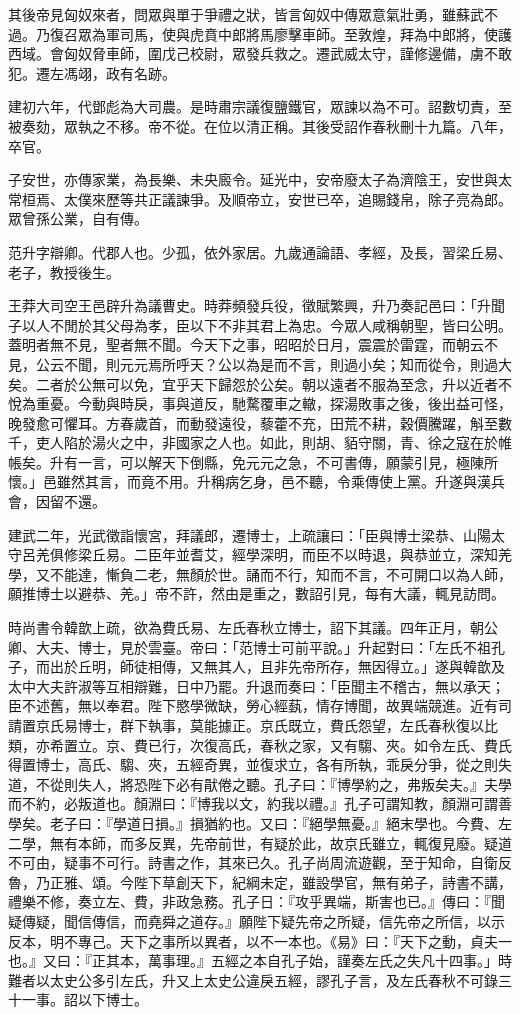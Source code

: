 \begin{pinyinscope}
其後帝見匈奴來者，問眾與單于爭禮之狀，皆言匈奴中傳眾意氣壯勇，雖蘇武不過。乃復召眾為軍司馬，使與虎賁中郎將馬廖擊車師。至敦煌，拜為中郎將，使護西域。會匈奴脅車師，圍戊己校尉，眾發兵救之。遷武威太守，謹修邊備，虜不敢犯。遷左馮翊，政有名跡。

建初六年，代鄧彪為大司農。是時肅宗議復鹽鐵官，眾諫以為不可。詔數切責，至被奏劾，眾執之不移。帝不從。在位以清正稱。其後受詔作春秋刪十九篇。八年，卒官。

子安世，亦傳家業，為長樂、未央廄令。延光中，安帝廢太子為濟陰王，安世與太常桓焉、太僕來歷等共正議諫爭。及順帝立，安世已卒，追賜錢帛，除子亮為郎。眾曾孫公業，自有傳。

范升字辯卿。代郡人也。少孤，依外家居。九歲通論語、孝經，及長，習梁丘易、老子，教授後生。

王莽大司空王邑辟升為議曹史。時莽頻發兵役，徵賦繁興，升乃奏記邑曰：「升聞子以人不閒於其父母為孝，臣以下不非其君上為忠。今眾人咸稱朝聖，皆曰公明。蓋明者無不見，聖者無不聞。今天下之事，昭昭於日月，震震於雷霆，而朝云不見，公云不聞，則元元焉所呼天？公以為是而不言，則過小矣；知而從令，則過大矣。二者於公無可以免，宜乎天下歸怨於公矣。朝以遠者不服為至念，升以近者不悅為重憂。今動與時戾，事與道反，馳騖覆車之轍，探湯敗事之後，後出益可怪，晚發愈可懼耳。方春歲首，而動發遠役，藜藿不充，田荒不耕，穀價騰躍，斛至數千，吏人陷於湯火之中，非國家之人也。如此，則胡、貊守關，青、徐之寇在於帷帳矣。升有一言，可以解天下倒縣，免元元之急，不可書傳，願蒙引見，極陳所懷。」邑雖然其言，而竟不用。升稱病乞身，邑不聽，令乘傳使上黨。升遂與漢兵會，因留不還。

建武二年，光武徵詣懷宮，拜議郎，遷博士，上疏讓曰：「臣與博士梁恭、山陽太守呂羌俱修梁丘易。二臣年並耆艾，經學深明，而臣不以時退，與恭並立，深知羌學，又不能達，慚負二老，無顏於世。誦而不行，知而不言，不可開口以為人師，願推博士以避恭、羌。」帝不許，然由是重之，數詔引見，每有大議，輒見訪問。

時尚書令韓歆上疏，欲為費氏易、左氏春秋立博士，詔下其議。四年正月，朝公卿、大夫、博士，見於雲臺。帝曰：「范博士可前平說。」升起對曰：「左氏不祖孔子，而出於丘明，師徒相傳，又無其人，且非先帝所存，無因得立。」遂與韓歆及太中大夫許淑等互相辯難，日中乃罷。升退而奏曰：「臣聞主不稽古，無以承天；臣不述舊，無以奉君。陛下愍學微缺，勞心經蓺，情存博聞，故異端競進。近有司請置京氏易博士，群下執事，莫能據正。京氏既立，費氏怨望，左氏春秋復以比類，亦希置立。京、費已行，次復高氏，春秋之家，又有騶、夾。如令左氏、費氏得置博士，高氏、騶、夾，五經奇異，並復求立，各有所執，乖戾分爭，從之則失道，不從則失人，將恐陛下必有猒倦之聽。孔子曰：『博學約之，弗叛矣夫。』夫學而不約，必叛道也。顏淵曰：『博我以文，約我以禮。』孔子可謂知教，顏淵可謂善學矣。老子曰：『學道日損。』損猶約也。又曰：『絕學無憂。』絕末學也。今費、左二學，無有本師，而多反異，先帝前世，有疑於此，故京氏雖立，輒復見廢。疑道不可由，疑事不可行。詩書之作，其來已久。孔子尚周流遊觀，至于知命，自衛反魯，乃正雅、頌。今陛下草創天下，紀綱未定，雖設學官，無有弟子，詩書不講，禮樂不修，奏立左、費，非政急務。孔子日：『攻乎異端，斯害也已。』傳曰：『聞疑傳疑，聞信傳信，而堯舜之道存。』願陛下疑先帝之所疑，信先帝之所信，以示反本，明不專己。天下之事所以異者，以不一本也。《易》曰：『天下之動，貞夫一也。』又曰：『正其本，萬事理。』五經之本自孔子始，謹奏左氏之失凡十四事。」時難者以太史公多引左氏，升又上太史公違戾五經，謬孔子言，及左氏春秋不可錄三十一事。詔以下博士。


\end{pinyinscope}
